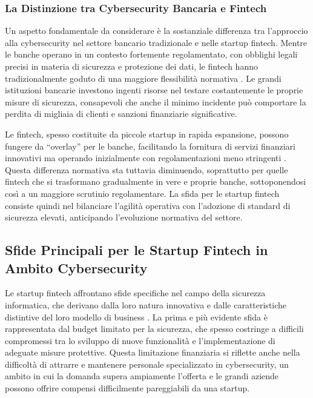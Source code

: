 \documentclass[a4paper,12pt]{report}
\begin{document}
\subsubsection*{La Distinzione tra Cybersecurity Bancaria e Fintech}

Un aspetto fondamentale da considerare è la sostanziale differenza tra l’approccio alla cybersecurity nel settore bancario tradizionale e nelle startup fintech. Mentre le banche operano in un contesto fortemente regolamentato, con obblighi legali precisi in materia di sicurezza e protezione dei dati, le fintech hanno tradizionalmente goduto di una maggiore flessibilità normativa \cite{bankingVsFintech}. Le grandi istituzioni bancarie investono ingenti risorse nel testare costantemente le proprie misure di sicurezza, consapevoli che anche il minimo incidente può comportare la perdita di migliaia di clienti e sanzioni finanziarie significative.

Le fintech, spesso costituite da piccole startup in rapida espansione, possono fungere da “overlay” per le banche, facilitando la fornitura di servizi finanziari innovativi ma operando inizialmente con regolamentazioni meno stringenti \cite{bankingVsFintech}. Questa differenza normativa sta tuttavia diminuendo, soprattutto per quelle fintech che si trasformano gradualmente in vere e proprie banche, sottoponendosi così a un maggiore scrutinio regolamentare. La sfida per le startup fintech consiste quindi nel bilanciare l’agilità operativa con l’adozione di standard di sicurezza elevati, anticipando l’evoluzione normativa del settore.

\subsection*{Sfide Principali per le Startup Fintech in Ambito Cybersecurity}

Le startup fintech affrontano sfide specifiche nel campo della sicurezza informatica, che derivano dalla loro natura innovativa e dalle caratteristiche distintive del loro modello di business \cite{fintechChallenges}. La prima e più evidente sfida è rappresentata dal budget limitato per la sicurezza, che spesso costringe a difficili compromessi tra lo sviluppo di nuove funzionalità e l’implementazione di adeguate misure protettive. Questa limitazione finanziaria si riflette anche nella difficoltà di attrarre e mantenere personale specializzato in cybersecurity, un ambito in cui la domanda supera ampiamente l’offerta e le grandi aziende possono offrire compensi difficilmente pareggiabili da una startup.
\end{document}
